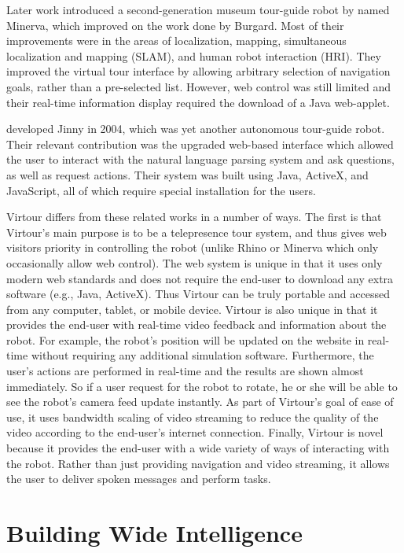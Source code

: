 \documentclass[
  oneside,
  11pt, a4paper,
  footinclude=true,
  headinclude=true,
  cleardoublepage=empty
]{article}
\begin{document}
Later work introduced a second-generation museum tour-guide robot by
\citet{thrun1999} named Minerva, which improved on the work done by Burgard.
Most of their improvements were in the areas of localization, mapping,
simultaneous localization and mapping (SLAM), and human robot interaction
(HRI). They improved the virtual tour interface by allowing arbitrary selection
of navigation goals, rather than a pre-selected list. However, web control was
still limited and their real-time information display required the download of
a Java web-applet.

\citet{kim2004} developed Jinny in 2004, which was yet another autonomous
tour-guide robot. Their relevant contribution was the upgraded web-based
interface which allowed the user to interact with the natural language parsing
system and ask questions, as well as request actions. Their system was built
using Java, ActiveX, and JavaScript, all of which require special installation
for the users.

Virtour differs from these related works in a number of ways. The first is that
Virtour's main purpose is to be a telepresence tour system, and thus gives web
visitors priority in controlling the robot (unlike Rhino or Minerva which only
occasionally allow web control). The web system is unique in that it uses only
modern web standards and does not require the end-user to download any extra
software (e.g., Java, ActiveX). Thus Virtour can be truly portable and accessed
from any computer, tablet, or mobile device. Virtour is also unique in that it
provides the end-user with real-time video feedback and information about the
robot. For example, the robot's position will be updated on the website in
real-time without requiring any additional simulation software. Furthermore,
the user's actions are performed in real-time and the results are shown almost
immediately. So if a user request for the robot to rotate, he or she will be
able to see the robot's camera feed update instantly. As part of Virtour's
goal of ease of use, it uses bandwidth scaling of video streaming to reduce the
quality of the video according to the end-user's internet connection. Finally,
Virtour is novel because it provides the end-user with a wide variety of ways
of interacting with the robot. Rather than just providing navigation and video
streaming, it allows the user to deliver spoken messages and perform tasks.

\section{Building Wide Intelligence}\label{sec:bwi}
\end{document}
